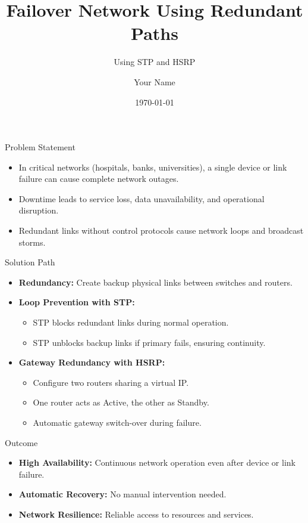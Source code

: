 \documentclass{beamer}
\title{Failover Network Using Redundant Paths}
\subtitle{Using STP and HSRP}
\author{Your Name}
\date{\today}
\begin{document}
\begin{frame}
\titlepage
\end{frame}

\begin{frame}{Problem Statement}
\begin{itemize}
    \item In critical networks (hospitals, banks, universities), a single device or link failure can cause complete network outages.
    \item Downtime leads to service loss, data unavailability, and operational disruption.
    \item Redundant links without control protocols cause network loops and broadcast storms.
\end{itemize}
\end{frame}

\begin{frame}{Solution Path}
\begin{itemize}
    \item \textbf{Redundancy:} Create backup physical links between switches and routers.
    \item \textbf{Loop Prevention with STP:} 
    \begin{itemize}
        \item STP blocks redundant links during normal operation.
        \item STP unblocks backup links if primary fails, ensuring continuity.
    \end{itemize}
    \item \textbf{Gateway Redundancy with HSRP:}
    \begin{itemize}
        \item Configure two routers sharing a virtual IP.
        \item One router acts as Active, the other as Standby.
        \item Automatic gateway switch-over during failure.
    \end{itemize}
\end{itemize}
\end{frame}

\begin{frame}{Outcome}
\begin{itemize}
    \item \textbf{High Availability:} Continuous network operation even after device or link failure.
    \item \textbf{Automatic Recovery:} No manual intervention needed.
    \item \textbf{Network Resilience:} Reliable access to resources and services.
\end{itemize}
\end{frame}
\end{document}
